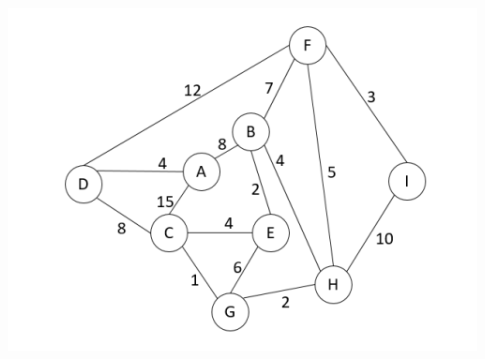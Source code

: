 \documentclass[10pt,letterpaper,unboxed,cm]{article}
\begin{document}
\begin{enumerate}
\begin{enumerate}
\includegraphics[scale=0.4]{Dijkstras}
\end{enumerate}

\end{enumerate}
\end{document}
